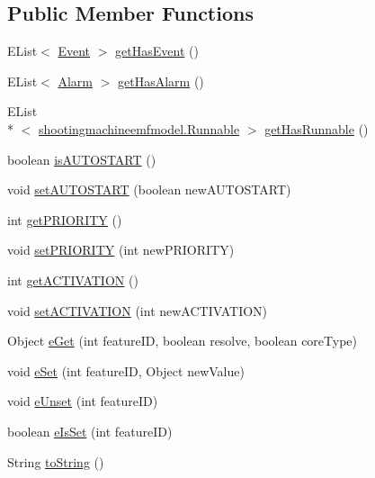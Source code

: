 \subsection*{Public Member Functions}
\begin{DoxyCompactItemize}
\item 
E\-List$<$ \hyperlink{interfaceshootingmachineemfmodel_1_1_event}{Event} $>$ \hyperlink{classshootingmachineemfmodel_1_1impl_1_1_task_impl_a7a7f8af008aa5bb195e34d29cfb0f982}{get\-Has\-Event} ()
\item 
E\-List$<$ \hyperlink{interfaceshootingmachineemfmodel_1_1_alarm}{Alarm} $>$ \hyperlink{classshootingmachineemfmodel_1_1impl_1_1_task_impl_a89dcca06c6b9120c2836ee850bd18073}{get\-Has\-Alarm} ()
\item 
E\-List\\*
$<$ \hyperlink{interfaceshootingmachineemfmodel_1_1_runnable}{shootingmachineemfmodel.\-Runnable} $>$ \hyperlink{classshootingmachineemfmodel_1_1impl_1_1_task_impl_a0d2049f4d0efcb7d3dea6f88429a3674}{get\-Has\-Runnable} ()
\item 
boolean \hyperlink{classshootingmachineemfmodel_1_1impl_1_1_task_impl_a21a04300417c61203bfbaa4750b93d0b}{is\-A\-U\-T\-O\-S\-T\-A\-R\-T} ()
\item 
void \hyperlink{classshootingmachineemfmodel_1_1impl_1_1_task_impl_a002af9c7b6f4a8039daae143ebd63d3b}{set\-A\-U\-T\-O\-S\-T\-A\-R\-T} (boolean new\-A\-U\-T\-O\-S\-T\-A\-R\-T)
\item 
int \hyperlink{classshootingmachineemfmodel_1_1impl_1_1_task_impl_afbc32e6264af20e59fee3c02b3a192fb}{get\-P\-R\-I\-O\-R\-I\-T\-Y} ()
\item 
void \hyperlink{classshootingmachineemfmodel_1_1impl_1_1_task_impl_ae79c3206c1f404487749159ae88661df}{set\-P\-R\-I\-O\-R\-I\-T\-Y} (int new\-P\-R\-I\-O\-R\-I\-T\-Y)
\item 
int \hyperlink{classshootingmachineemfmodel_1_1impl_1_1_task_impl_a7d652c92762b3e960b4fc28dacd002d0}{get\-A\-C\-T\-I\-V\-A\-T\-I\-O\-N} ()
\item 
void \hyperlink{classshootingmachineemfmodel_1_1impl_1_1_task_impl_aa367c0dd656db4c390c6be474bfe44f6}{set\-A\-C\-T\-I\-V\-A\-T\-I\-O\-N} (int new\-A\-C\-T\-I\-V\-A\-T\-I\-O\-N)
\item 
Object \hyperlink{classshootingmachineemfmodel_1_1impl_1_1_task_impl_ab2d172cf5a99333daf185ae113b3fe6d}{e\-Get} (int feature\-I\-D, boolean resolve, boolean core\-Type)
\item 
void \hyperlink{classshootingmachineemfmodel_1_1impl_1_1_task_impl_aa0d98d3012b17d56da5d1c57802694ea}{e\-Set} (int feature\-I\-D, Object new\-Value)
\item 
void \hyperlink{classshootingmachineemfmodel_1_1impl_1_1_task_impl_a0eac43b92abad78b8a0d7b3c01b20748}{e\-Unset} (int feature\-I\-D)
\item 
boolean \hyperlink{classshootingmachineemfmodel_1_1impl_1_1_task_impl_a6fccfd7e3058225a3f8bf5e2bbc89814}{e\-Is\-Set} (int feature\-I\-D)
\item 
String \hyperlink{classshootingmachineemfmodel_1_1impl_1_1_task_impl_aedfdfe087823bf27271de9c6bfba6622}{to\-String} ()
\end{DoxyCompactItemize}
